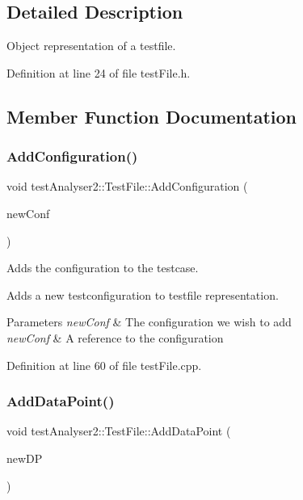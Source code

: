 \subsection{Detailed Description}
Object representation of a testfile. 

Definition at line 24 of file test\+File.\+h.



\subsection{Member Function Documentation}
\mbox{\label{classtestAnalyser2_1_1TestFile_aabedadfa43358f3069e0fe958d7582e7}} 
\subsubsection{\texorpdfstring{AddConfiguration()}{AddConfiguration()}}
{\footnotesize\ttfamily void test\+Analyser2\+::\+Test\+File\+::\+Add\+Configuration (\begin{DoxyParamCaption}\item[{\mbox{\hyperlink{structtestAnalyser2_1_1testConfiguration}{test\+Configuration}} \&}]{new\+Conf }\end{DoxyParamCaption})}



Adds the configuration to the testcase. 

Adds a new testconfiguration to testfile representation.


\begin{DoxyParams}{Parameters}
{\em new\+Conf} & The configuration we wish to add\\
\hline
{\em new\+Conf} & A reference to the configuration \\
\hline
\end{DoxyParams}


Definition at line 60 of file test\+File.\+cpp.

\mbox{\label{classtestAnalyser2_1_1TestFile_ab0d5ab55a41a9bf4f15f0eb10f945bd3}} 
\subsubsection{\texorpdfstring{AddDataPoint()}{AddDataPoint()}}
{\footnotesize\ttfamily void test\+Analyser2\+::\+Test\+File\+::\+Add\+Data\+Point (\begin{DoxyParamCaption}\item[{\mbox{\hyperlink{structtestAnalyser2_1_1dataPoint}{data\+Point}} \&}]{new\+DP }\end{DoxyParamCaption})}



